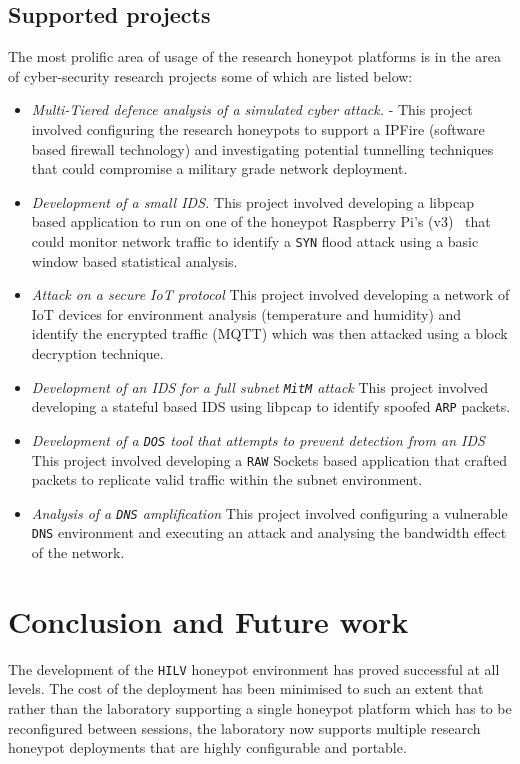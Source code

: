 \subsection{Supported projects}\label{Projects}
The most prolific area of usage of the research honeypot platforms is in the area of cyber-security research projects some of which are listed below: 
\begin{itemize}
\item \noindent \emph{Multi-Tiered defence analysis of a simulated cyber attack.} - This project involved configuring the research honeypots to support a IPFire (software based firewall technology) and investigating potential tunnelling techniques that could compromise a military grade network deployment.
\item \noindent \emph{Development of a small IDS.} This project involved developing a libpcap based application to run on one of the honeypot Raspberry Pi's (v3)~\cite{RASP:17} that could monitor network traffic to identify a \texttt{SYN} flood attack using a basic window based statistical analysis.
\item \noindent \emph{Attack on a secure IoT protocol} This project involved developing a network of IoT devices for environment analysis (temperature and humidity) and identify the encrypted traffic (MQTT) which was then attacked using a block decryption technique.
\item \noindent \emph{Development of an IDS for a full subnet \texttt{MitM} attack} This project involved developing a stateful based IDS using libpcap to identify spoofed \texttt{ARP} packets.
\item \noindent \emph{Development of a \texttt{DOS} tool that attempts to prevent detection from an IDS} This project involved developing a \texttt{RAW} Sockets based application that crafted packets to replicate valid traffic within the subnet environment.
\item \noindent \emph{Analysis of a \texttt{DNS} amplification} This project involved configuring a vulnerable \texttt{DNS} environment and executing an attack and analysing the bandwidth effect of the network.
\end{itemize}

\section{Conclusion and Future work}\label{Future}
The development of the \texttt{HILV} honeypot environment has proved successful at all levels. The cost of the deployment has been minimised to such an extent that rather than the laboratory supporting a single honeypot platform which has to be reconfigured between sessions, the laboratory now supports multiple research honeypot deployments that are highly configurable and portable. 

